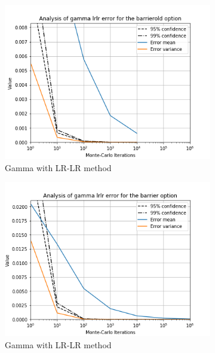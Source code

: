 \documentclass[11pt,a4paper,fleqn]{article}
\begin{document}
\begin{figure}[h!]
      \begin{subfigure}[b]{0.3\textwidth}
          \includegraphics[width=\textwidth]{graphs/barrieroldgammalrlr.png}
          \caption{Gamma with LR-LR method}
      \end{subfigure}
      \begin{subfigure}[b]{0.3\textwidth}
          \includegraphics[width=\textwidth]{graphs/barriergammalrlr.png}
          \caption{Gamma with LR-LR method}
      \end{subfigure}
      \begin{subfigure}[b]{0.3\textwidth}

\end{subfigure}
\end{figure}
\end{document}
